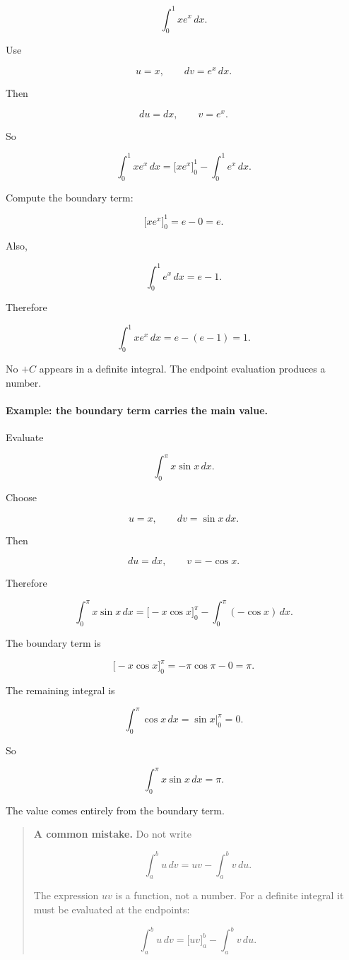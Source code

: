 \[
\int_0^1 x e^x\,dx.
\]

Use

\[
u=x,
\qquad
dv=e^x\,dx.
\]

Then

\[
du=dx,
\qquad
v=e^x.
\]

So

\[
\int_0^1 x e^x\,dx
=
\bigl[x e^x\bigr]_0^1-\int_0^1 e^x\,dx.
\]

Compute the boundary term:

\[
\bigl[x e^x\bigr]_0^1=e-0=e.
\]

Also,

\[
\int_0^1 e^x\,dx=e-1.
\]

Therefore

\[
\int_0^1 x e^x\,dx
=
e-(e-1)=\boxed{1}.
\]

No \(+C\) appears in a definite integral.  The endpoint evaluation produces a number.

\paragraph{Example: the boundary term carries the main value.}
Evaluate

\[
\int_0^\pi x\sin x\,dx.
\]

Choose

\[
u=x,
\qquad
dv=\sin x\,dx.
\]

Then

\[
du=dx,
\qquad
v=-\cos x.
\]

Therefore

\[
\int_0^\pi x\sin x\,dx
=
\bigl[-x\cos x\bigr]_0^\pi-\int_0^\pi (-\cos x)\,dx.
\]

The boundary term is

\[
\bigl[-x\cos x\bigr]_0^\pi
=
-\pi\cos\pi-0
=
\pi.
\]

The remaining integral is

\[
\int_0^\pi \cos x\,dx
=
\sin x\Big|_0^\pi
=
0.
\]

So

\[
\boxed{
\int_0^\pi x\sin x\,dx=\pi.
}
\]

The value comes entirely from the boundary term.

\begin{quote}
\textbf{A common mistake.}
Do not write

\[
\int_a^b u\,dv=uv-\int_a^b v\,du.
\]

The expression \(uv\) is a function, not a number.  For a definite integral it must be
evaluated at the endpoints:

\[
\int_a^b u\,dv=\bigl[uv\bigr]_a^b-\int_a^b v\,du.
\]
\end{quote}

